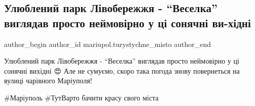 
 
 
 
 

\subsection{Улюблений парк Лівобережжя - \enquote{Веселка} виглядав просто неймовірно у ці сонячні ви\hyp{}хідні}
\label{sec:03_11_2021.fb.mariupol.turystychne_misto.1.park_veselka_sonjachni_vyhidni}

\ifcmt
 author_begin
   author_id mariupol.turystychne_misto
 author_end
\fi

Улюблений парк Лівобережжя - \enquote{Веселка} виглядав просто неймовірно у ці сонячні
вихідні 😍 Але не сумуємо, скоро така погода знову повернеться на вулиці
чарівного Маріуполя! 

\#Маріуполь \#ТутВарто бачити красу свого міста
